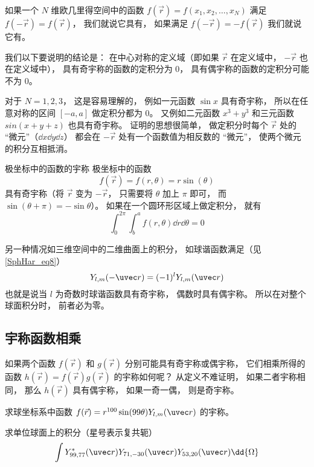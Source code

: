 
如果一个 $N$ 维欧几里得空间中的函数 $f(\vec r) = f(x_1, x_2, \dots, x_N)$ 满足  $f(-\vec r) = f(\vec r)$， 我们就说它具有， 如果满足  $f(-\vec r) = -f(\vec r)$ 我们就说它有。

我们以下要说明的结论是： 在中心对称的定义域（即如果 $\vec r$ 在定义域中， $-\vec r$ 也在定义域中）， 具有奇宇称的函数的定积分为 0， 具有偶宇称的函数的定积分可能不为 0。

对于 $N = 1, 2, 3$， 这是容易理解的， 例如一元函数 $\sin x$ 具有奇宇称， 所以在任意对称的区间 $[-a, a]$ 做定积分都为 0。 又例如二元函数 $x^3 + y^3$ 和三元函数 $sin(x + y + z)$ 也具有奇宇称。 证明的思想很简单， 做定积分时每个 $\vec r$ 处的 “微元”（$\dd{x}\dd{y}\dd{z}$） 都会在 $-\vec r$ 处有一个函数值为相反数的 “微元”， 使两个微元的积分互相抵消。

\begin{exam}{极坐标中的函数的宇称}
极坐标中的函数
\begin{equation}\label{IntPry_eq1}
f(\vec r) = f(r, \theta) = r\sin(\theta)
\end{equation}
具有奇宇称（将 $\vec r$ 变为 $-\vec r$， 只需要将 $\theta$ 加上 $\pi$ 即可， 而 $\sin(\theta + \pi) = -\sin\theta$）。 如果在一个圆环形区域上做定积分， 就有
\begin{equation}
\int_0^{2\pi} \int_b^a f(r, \theta) \dd{r} \dd{\theta} = 0
\end{equation}
\end{exam}

另一种情况如三维空间中的二维曲面上的积分， 如球谐函数满足（见\autoref{SphHar_eq8}）
\begin{equation}\label{IntPry_eq3}
Y_{l,m}(-\uvec r) = (-1)^l Y_{l,m}(\uvec r)
\end{equation}
也就是说当 $l$ 为奇数时球谐函数具有奇宇称， 偶数时具有偶宇称。 所以在对整个球面积分时， 前者必为零。

\subsection{宇称函数相乘}
如果两个函数 $f(\vec r)$ 和 $g(\vec r)$ 分别可能具有奇宇称或偶宇称， 它们相乘所得的函数 $h(\vec r) = f(\vec r) g(\vec r)$ 的宇称如何呢？ 从定义不难证明， 如果二者宇称相同， 那么 $h(\vec r)$ 具有偶宇称， 如果一奇一偶， 则是奇宇称。

\begin{exer}{}
求球坐标系中函数 $f(\vec r) = r^{100}\sin(99\theta) Y_{l, m}(\uvec r)$ 的宇称。
\end{exer}

\begin{exer}{}
求单位球面上的积分（星号表示复共轭）
\begin{equation}
\int Y_{99, 77}^*(\uvec r) Y_{71, -30}(\uvec r) Y_{53, 20}(\uvec r) \dd{\Omega}
\end{equation}
\end{exer}
